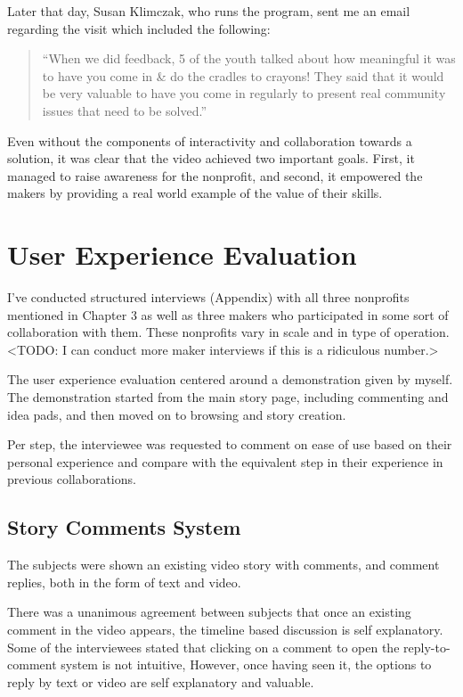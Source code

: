 Later that day, Susan Klimczak, who runs the program, sent me an email regarding the visit which included the following:

\begin{quotation}

``When we did feedback, 5 of the youth talked about how meaningful it was to have you come in \& do the cradles to crayons! They said that it would be very valuable to have you come in regularly to present real community issues that need to be solved.''

\end{quotation}

Even without the components of interactivity and collaboration towards a solution, it was clear that the video achieved two important goals. First, it managed to raise awareness for the nonprofit, and second, it empowered the makers by providing a real world example of the value of their skills.

\section{User Experience Evaluation}

I've conducted structured interviews (Appendix) with all three nonprofits mentioned in Chapter 3 as well as three makers who participated in some sort of collaboration with them. These nonprofits vary in scale and in type of operation. <TODO: I can conduct more maker interviews if this is a ridiculous number.>

The user experience evaluation centered around a demonstration given by myself. The demonstration started from the main story page, including commenting and idea pads, and then moved on to browsing and story creation. 

Per step, the interviewee was requested to comment on ease of use based on their personal experience and compare with the equivalent step in their experience in previous collaborations. 

\subsection{Story Comments System}

The subjects were shown an existing video story with comments, and comment replies, both in the form of text and video.

There was a unanimous agreement between subjects that once an existing comment in the video appears, the timeline based discussion is self explanatory. Some of the interviewees stated that clicking on a comment to open the reply-to-comment system is not intuitive, However, once having seen it, the options to reply by text or video are self explanatory and valuable.

